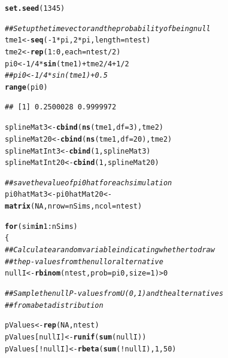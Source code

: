 \documentclass{article}\usepackage[]{graphicx}\usepackage[]{color}
\makeatletter
\newcommand{\hlnum}[1]{\textcolor[rgb]{0.686,0.059,0.569}{#1}}%
\newcommand{\hlcom}[1]{\textcolor[rgb]{0.678,0.584,0.686}{\textit{#1}}}%
\newcommand{\hlopt}[1]{\textcolor[rgb]{0,0,0}{#1}}%
\newcommand{\hlstd}[1]{\textcolor[rgb]{0.345,0.345,0.345}{#1}}%
\newcommand{\hlkwa}[1]{\textcolor[rgb]{0.161,0.373,0.58}{\textbf{#1}}}%
\newcommand{\hlkwb}[1]{\textcolor[rgb]{0.69,0.353,0.396}{#1}}%
\newcommand{\hlkwc}[1]{\textcolor[rgb]{0.333,0.667,0.333}{#1}}%
\newcommand{\hlkwd}[1]{\textcolor[rgb]{0.737,0.353,0.396}{\textbf{#1}}}%
\newenvironment{kframe}{%
 \def\at@end@of@kframe{}%
 \ifinner\ifhmode%
  \def\at@end@of@kframe{\end{minipage}}%
  \begin{minipage}{\columnwidth}%
 \fi\fi%
 \def\FrameCommand##1{\hskip\@totalleftmargin \hskip-\fboxsep
 \colorbox{shadecolor}{##1}\hskip-\fboxsep
     \hskip-\linewidth \hskip-\@totalleftmargin \hskip\columnwidth}%
 \MakeFramed {\advance\hsize-\width
   \@totalleftmargin\z@ \linewidth\hsize
   \@setminipage}}%
 {\par\unskip\endMakeFramed%
 \at@end@of@kframe}
\newenvironment{knitrout}{}{} %
\makeatother
\begin{document}
\begin{knitrout}
\color{fgcolor}\begin{kframe}
\begin{alltt}
\hlkwd{set.seed}\hlstd{(}\hlnum{1345}\hlstd{)}

\hlcom{## Set up the time vector and the probability of being null}
\hlstd{tme1} \hlkwb{<-} \hlkwd{seq}\hlstd{(}\hlopt{-}\hlnum{1}\hlopt{*}\hlstd{pi,}\hlnum{2}\hlopt{*}\hlstd{pi,}\hlkwc{length}\hlstd{=ntest)}
\hlstd{tme2} \hlkwb{<-} \hlkwd{rep}\hlstd{(}\hlnum{1}\hlopt{:}\hlnum{0}\hlstd{,} \hlkwc{each}\hlstd{=ntest}\hlopt{/}\hlnum{2}\hlstd{)}
\hlstd{pi0} \hlkwb{<-} \hlnum{1}\hlopt{/}\hlnum{4}\hlopt{*}\hlkwd{sin}\hlstd{(tme1)} \hlopt{+} \hlstd{tme2}\hlopt{/}\hlnum{4} \hlopt{+} \hlnum{1}\hlopt{/}\hlnum{2}
\hlcom{##pi0 <- 1/4*sin(tme1) + 0.5}
\hlkwd{range}\hlstd{(pi0)}
\end{alltt}
\begin{verbatim}
## [1] 0.2500028 0.9999972
\end{verbatim}
\begin{alltt}
\hlstd{splineMat3} \hlkwb{<-} \hlkwd{cbind}\hlstd{(}\hlkwd{ns}\hlstd{(tme1,}\hlkwc{df}\hlstd{=}\hlnum{3}\hlstd{), tme2)}
\hlstd{splineMat20} \hlkwb{<-} \hlkwd{cbind}\hlstd{(}\hlkwd{ns}\hlstd{(tme1,}\hlkwc{df}\hlstd{=}\hlnum{20}\hlstd{), tme2)}
\hlstd{splineMatInt3} \hlkwb{<-} \hlkwd{cbind}\hlstd{(}\hlnum{1}\hlstd{, splineMat3)}
\hlstd{splineMatInt20} \hlkwb{<-} \hlkwd{cbind}\hlstd{(}\hlnum{1}\hlstd{, splineMat20)}

\hlcom{##save the value of pi0hat for each simulation}
\hlstd{pi0hatMat3} \hlkwb{<-} \hlstd{pi0hatMat20} \hlkwb{<-}
  \hlkwd{matrix}\hlstd{(}\hlnum{NA}\hlstd{,} \hlkwc{nrow}\hlstd{=nSims,} \hlkwc{ncol}\hlstd{=ntest)}

\hlkwa{for}\hlstd{(sim} \hlkwa{in} \hlnum{1}\hlopt{:}\hlstd{nSims)}
\hlstd{\{}
  \hlcom{## Calculate a random variable indicating whether to draw}
  \hlcom{## the p-values from the null or alternative}
  \hlstd{nullI} \hlkwb{<-} \hlkwd{rbinom}\hlstd{(ntest,}\hlkwc{prob}\hlstd{=pi0,}\hlkwc{size}\hlstd{=}\hlnum{1}\hlstd{)}\hlopt{>} \hlnum{0}

  \hlcom{## Sample the null P-values from U(0,1) and the alternatives}
  \hlcom{## from a beta distribution}

  \hlstd{pValues} \hlkwb{<-} \hlkwd{rep}\hlstd{(}\hlnum{NA}\hlstd{,ntest)}
  \hlstd{pValues[nullI]} \hlkwb{<-} \hlkwd{runif}\hlstd{(}\hlkwd{sum}\hlstd{(nullI))}
  \hlstd{pValues[}\hlopt{!}\hlstd{nullI]} \hlkwb{<-} \hlkwd{rbeta}\hlstd{(}\hlkwd{sum}\hlstd{(}\hlopt{!}\hlstd{nullI),}\hlnum{1}\hlstd{,}\hlnum{50}\hlstd{)}


\end{alltt}
\end{kframe}
\end{knitrout}
\end{document}
